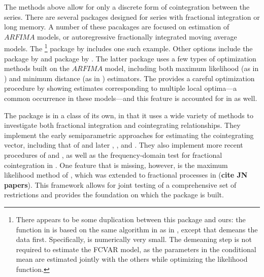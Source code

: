 \documentclass[article]{jss}
\newcommand{\fct}[1]{\code{#1()}}
\begin{document}
The methods above allow for only a discrete form of cointegration between the series. 
There are several packages designed for series with fractional integration or long memory. 
% 
A number of these pacakages are focused on estimation of $ARFIMA$ models, or autoregressive fractionally integrated moving average models. 
% 
The %
\footnote{There appears to be some duplication between this package and ours: 
the \fct{diffseries} function in  is based on the same algorithm in \cite{Jensen2014} as \fct{FracDiff} in , except that \fct{diffseries} demeans the data first. 
Specifically,  is numerically very small. 
The demeaning step is not required to estimate the FCVAR model, as the parameters in the conditional mean are estimated jointly with the others while optimizing the likelihood function. }
%
package by \citep{fracdiff2020} includes one such example. 
% 
Other options include the  package by \cite{arfima2018}
and  package by \citep{nsarfima2019}. 
The latter package uses a few types of optimization methods built on the $ARFIMA$ model, including both maximum likelihood (as in \citet{Beran1995}) and minimum distance (as in \citet{Mayoral2007}) estimators. 
The  provides a careful optimization procedure by showing estimates corresponding to multiple local optima---a common occurrence in these models---and this feature is accounted for in  as well.
% 

The package  is in a class of its own, in that it uses a wide variety of methods to investigate both fractional integration and cointegrating relationships. 
They implement the early semiparametric approaches for estimating the cointegrating vector, including that of 
\citet{Robinson1994} and later \citet{RobinsonMarinucci2003}, \citet{MarmolVelasco2004},  \citet{ChristensenNielsen2006} and \citet{Robinson2008}. 
% 
They also implement more recent procedures of \citet{Nielsen2010} and \citet{WangWangChan2015}, 
as well as the frequency-domain test for fractional cointegration in \citet{SouzaEtal2018}. 
% 
% 
One feature that is missing, however, is the maximum likelihood method of \citet{Johansen1995}, which was extended to fractional processes in (\textbf{cite JN papers}).
This framework allows for joint testing of a comprehensive set of restrictions and provides the 
foundation on which the  package is built. 
\end{document}
